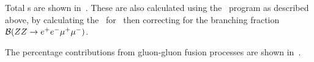 Total \cx s are shown in~. These are also
calculated using the \mcfm\ program as described above, by
calculating the \cx\  for \ZZeemm\ then correcting for the branching
fraction $\mathcal{B}(ZZ\rightarrow e^{+}e^{-}\mu^{+}\mu^{-})$. 

The percentage contributions from
gluon-gluon fusion processes are shown in~.


%
%
